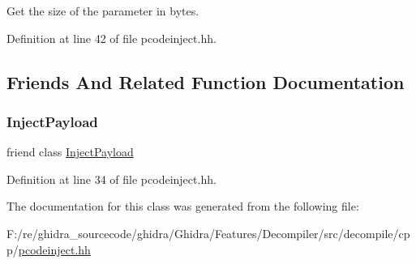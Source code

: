 Get the size of the parameter in bytes. 



Definition at line 42 of file pcodeinject.\+hh.



\subsection{Friends And Related Function Documentation}
\mbox{\label{class_inject_parameter_a9753ac525fa8dede3f71c665c8985741}} 
\subsubsection{\texorpdfstring{InjectPayload}{InjectPayload}}
{\footnotesize\ttfamily friend class \mbox{\hyperlink{class_inject_payload}{Inject\+Payload}}\hspace{0.3cm}{\ttfamily [friend]}}



Definition at line 34 of file pcodeinject.\+hh.



The documentation for this class was generated from the following file\+:\begin{DoxyCompactItemize}
\item 
F\+:/re/ghidra\+\_\+sourcecode/ghidra/\+Ghidra/\+Features/\+Decompiler/src/decompile/cpp/\mbox{\hyperlink{pcodeinject_8hh}{pcodeinject.\+hh}}\end{DoxyCompactItemize}
